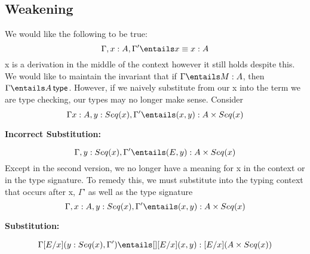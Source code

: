 \documentclass[11pt]{article}
\begin{document}
\subsection*{Weakening}
We would like the following to be true:
$$\Gamma, x : A, \Gamma' \entails x \equiv x: A$$
x is a derivation in the middle of the context however it still holds despite this.  We would like to maintain the invariant that if $\Gamma \entails M : A$, then $\Gamma \entails \isTp{A}$. However, if we naively substitute from our x into the term we are type checking, our types may no longer make sense. Consider
$$\Gamma x : A, y : Seq(x), \Gamma' \entails (x, y) : A \times Seq(x)$$
\begin{center} \textbf{Incorrect Substitution:} \end{center}
$$\Gamma, y : Seq(x), \Gamma' \entails (E, y) : A \times Seq(x)$$
Except in the second version, we no longer have a meaning for x in the context or in the type signature. To remedy this, we must substitute into the typing context that occurs after x, $\Gamma$' as well as the type signature
$$\Gamma, x : A, y : Seq(x), \Gamma' \entails (x, y) : A \times Seq(x)$$
\begin{center} \textbf{Substitution:} \end{center}
$$\Gamma [E/x](y : Seq(x), \Gamma') \entails [][E/x](x, y) : [E/x](A \times Seq(x))$$
\end{document}
